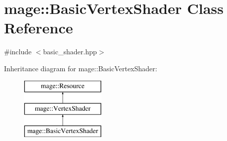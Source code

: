 \hypertarget{classmage_1_1_basic_vertex_shader}{}\section{mage\+:\+:Basic\+Vertex\+Shader Class Reference}
\label{classmage_1_1_basic_vertex_shader}


{\ttfamily \#include $<$basic\+\_\+shader.\+hpp$>$}

Inheritance diagram for mage\+:\+:Basic\+Vertex\+Shader\+:\begin{figure}[H]
\begin{center}
\leavevmode
\includegraphics[height=3.000000cm]{classmage_1_1_basic_vertex_shader}
\end{center}
\end{figure}
